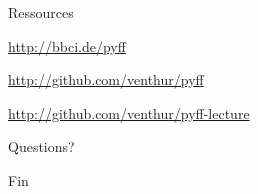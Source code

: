 \documentclass{beamer}
\begin{document}
\begin{frame}{Ressources}
    \begin{description}[xxxxxxxxxxxxxxxxxxxxxxx]
        \item[Pyff Homepage] \url{http://bbci.de/pyff}
        \item[git Repository] \url{http://github.com/venthur/pyff}
        \item[Exercises and Material]
            \url{http://github.com/venthur/pyff-lecture}
    \end{description}
\end{frame}

\begin{frame}[plain]
    \begin{center}
        \huge{Questions?}
    \end{center}
\end{frame}

\begin{frame}[plain]
    \begin{center}
        \huge{Fin}
    \end{center}
\end{frame}
\end{document}
